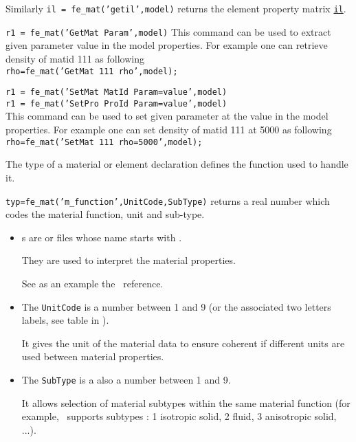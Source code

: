 Similarly {\tt il = fe\_mat('getil',model)} returns the element property matrix \hyperlink{il}{{\tt il}}.

 
{\tt r1 = fe\_mat('GetMat {\ti Param}',model)}
This command can be used to extract given parameter  value in the model properties.
For example one can retrieve density of matid 111 as following\\
{\tt rho=fe\_mat('GetMat 111 rho',model);}\\

 
{\tt r1 = fe\_mat('SetMat {\ti MatId}  {\ti Param}={\ti value}',model)}\\
{\tt r1 = fe\_mat('SetPro {\ti ProId}  {\ti Param}={\ti value}',model)}\\

This command can be used to set given parameter  at the value  in the model properties. 
For example one can set density of matid 111 at 5000 as following\\
{\tt rho=fe\_mat('SetMat 111 rho=5000',model);}\\


 The type of a material or element declaration defines the function used to handle it.  

{\tt typ=fe\_mat('m\_function',UnitCode,SubType)} returns a real number which codes the material function, unit and sub-type. 
\begin{itemize}
\item {}s are  or  files whose name starts with . 

They are used to interpret the material properties. 

See as an example the \melastic\ reference.

\item The {\tt UnitCode} is a number between 1 and 9 (or the associated two letters labels, see table in ). 

It gives the unit of the material data to ensure coherent if different units are used between material properties.

\item The {\tt SubType} is a also a number between 1 and 9.

It allows selection of material subtypes within the same material function (for example, \melastic\ supports subtypes : 1 isotropic solid, 2 fluid, 3 anisotropic solid, ...).

\end{itemize}

